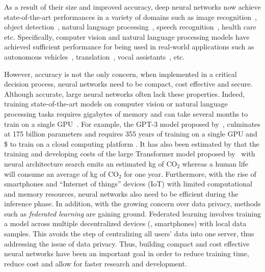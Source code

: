 As a result of their size and improved accuracy, deep neural networks now achieve state-of-the-art performances in a variety of domains such as image recognition~\cite{lecun1998gradient,krizhevsky2012imagenet,he2016deep,tan2019efficientnet}, object detection~\cite{redmon2016you,liu2016ssd,redmon2017yolo9000}, natural language processing~\cite{merity2016pointer,vaswani2017attention,radford2018Language,brown2020language}, speech recognition~\cite{hinton2012deep,abdel2014convolutional,yu2016automatic}, health care \cite{faust2018deep} etc.
Specifically, computer vision and natural language processing models have achieved sufficient performance for being used in real-world applications such as autonomous vehicles~\cite{fagnant2015preparing,sharma2021automating}, translation~\cite{wu2016google}, vocal assistants~\cite{li2017acoustic}, etc.

However, accuracy is not the only concern, when implemented in a critical decision process, neural networks need to be compact, cost effective and secure.
Although accurate, large neural networks often lack these properties.
Indeed, training state-of-the-art models on computer vision or natural language processing tasks requires gigabytes of memory and can take several months to train on a single GPU~\cite{krizhevsky2012imagenet,brown2020language}.
For example, the GPT-3 model proposed by~\citet{brown2020language}, culminates at 175 billion parameters and requires 355 years of training on a single GPU and \$ to train on a cloud computing platform \cite{li2020overview}.
It has also been estimated by \citet{strubell2019energy} that the training and developing costs of the large Transformer model proposed by~\citet{vaswani2017attention} with neural architecture search emits an estimated  kg of $\mathrm{CO}_2$ whereas a human life will consume an average of  kg of $\mathrm{CO}_2$ for one year. 
Furthermore, with the rise of smartphones and ``Internet of things'' devices (IoT) with limited computational and memory resources, neural networks also need to be efficient during the inference phase.
In addition, with the growing concern over data privacy, methods such as \emph{federated learning} are gaining ground.
Federated learning involves training a model across multiple decentralized devices (\eg, smartphones) with local data samples.
This avoids the step of centralizing all users' data into one server, thus addressing the issue of data privacy.
Thus, building compact and cost effective neural networks have been an important goal in order to reduce training time, reduce cost and allow for faster research and development.

